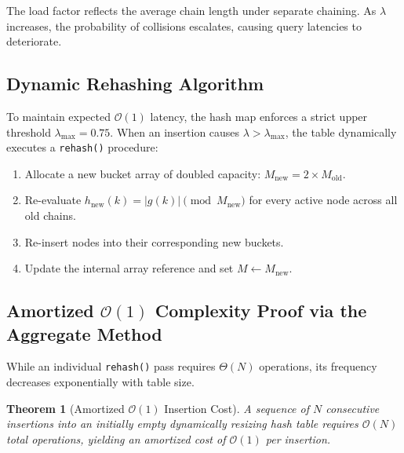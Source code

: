 \documentclass[10pt,twocolumn,letterpaper]{article}
\newtheorem{theorem}{Theorem}
\begin{document}
The load factor reflects the average chain length under separate chaining. As $\lambda$ increases, the probability of collisions escalates, causing query latencies to deteriorate.

\subsection{Dynamic Rehashing Algorithm}
To maintain expected $\mathcal{O}(1)$ latency, the hash map enforces a strict upper threshold $\lambda_{\max} = 0.75$. When an insertion causes $\lambda > \lambda_{\max}$, the table dynamically executes a \texttt{rehash()} procedure:
\begin{enumerate}
    \item Allocate a new bucket array of doubled capacity: $M_{\text{new}} = 2 \times M_{\text{old}}$.
    \item Re-evaluate $h_{\text{new}}(k) = |g(k)| \pmod{M_{\text{new}}}$ for every active node across all old chains.
    \item Re-insert nodes into their corresponding new buckets.
    \item Update the internal array reference and set $M \leftarrow M_{\text{new}}$.
\end{enumerate}

\subsection{Amortized $\mathcal{O}(1)$ Complexity Proof via the Aggregate Method}

While an individual \texttt{rehash()} pass requires $\Theta(N)$ operations, its frequency decreases exponentially with table size.

\begin{theorem}[Amortized $\mathcal{O}(1)$ Insertion Cost]
A sequence of $N$ consecutive insertions into an initially empty dynamically resizing hash table requires $\mathcal{O}(N)$ total operations, yielding an amortized cost of $\mathcal{O}(1)$ per insertion.
\end{theorem}
\end{document}
